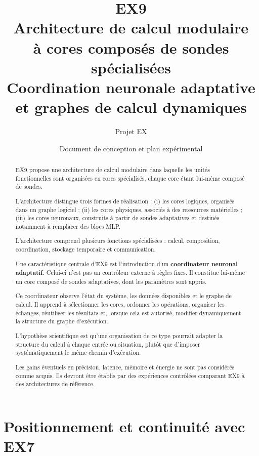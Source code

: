 \documentclass[11pt,a4paper]{article}
\title{
  \textbf{EX9}\\[0.3cm]
  \Large Architecture de calcul modulaire\\
  \Large à cores composés de sondes spécialisées\\[0.2cm]
  \normalsize
  Coordination neuronale adaptative et graphes de calcul dynamiques
}
\author{Projet EX}
\date{Document de conception et plan expérimental}
\begin{document}
\maketitle

\begin{abstract}

EX9 propose une architecture de calcul modulaire dans laquelle les
unités fonctionnelles sont organisées en cores spécialisés, chaque
core étant lui-même composé de sondes.

L'architecture distingue trois formes de réalisation :
(i) les cores logiques, organisés dans un graphe logiciel ;
(ii) les cores physiques, associés à des ressources matérielles ;
(iii) les cores neuronaux, construits à partir de sondes adaptatives
et destinés notamment à remplacer des blocs MLP.

L'architecture comprend plusieurs fonctions spécialisées :
calcul, composition, coordination, stockage temporaire et
communication.

Une caractéristique centrale d'EX9 est l'introduction d'un
\textbf{coordinateur neuronal adaptatif}. Celui-ci n'est pas un
contrôleur externe à règles fixes. Il constitue lui-même un core
composé de sondes adaptatives, dont les paramètres sont appris.

Ce coordinateur observe l'état du système, les données disponibles
et le graphe de calcul. Il apprend à sélectionner les cores,
ordonner les opérations, organiser les échanges, réutiliser les
résultats et, lorsque cela est autorisé, modifier dynamiquement
la structure du graphe d'exécution.

L'hypothèse scientifique est qu'une organisation de ce type pourrait
adapter la structure du calcul à chaque entrée ou situation, plutôt
que d'imposer systématiquement le même chemin d'exécution.

Les gains éventuels en précision, latence, mémoire et énergie ne sont
pas considérés comme acquis. Ils devront être établis par des
expériences contrôlées comparant EX9 à des architectures de référence.

\end{abstract}

\tableofcontents
\newpage

\section{Positionnement et continuité avec EX7}
\end{document}
